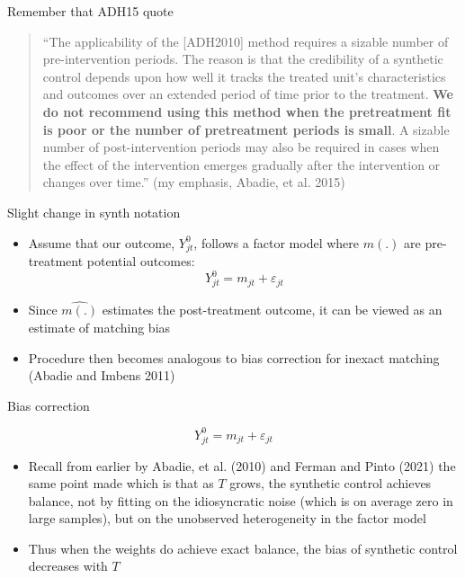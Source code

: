 \documentclass{beamer}
\begin{document}
\begin{frame}{Remember that ADH15 quote}

\begin{quote}
``The applicability of the [ADH2010] method requires a sizable number of pre-intervention periods. The reason is that the credibility of a synthetic control depends upon how well it tracks the treated unit’s characteristics and outcomes over an extended period of time prior to the treatment. \textbf{We do not recommend using this method when the pretreatment fit is poor or the number of pretreatment periods is small}. A sizable number of post-intervention periods may also be required in cases when the effect of the intervention emerges gradually after the intervention or changes over time.'' (my emphasis, Abadie, et al. 2015)
\end{quote}

\end{frame}

\begin{frame}{Slight change in synth notation}

\begin{itemize}
\item Assume that our outcome, $Y^0_{jt}$, follows a factor model where $m(.)$ are pre-treatment potential outcomes: $$ Y_{jt}^0 = m_{jt} + \varepsilon_{jt}$$
\item Since $\widehat{m(.)}$ estimates the post-treatment outcome, it can be viewed as an estimate of matching bias
\item Procedure then becomes analogous to bias correction for inexact matching (Abadie and Imbens 2011)
\end{itemize}

\end{frame}



\begin{frame}{Bias correction}

 $$ Y_{jt}^0 = m_{jt} + \varepsilon_{jt}$$

\begin{itemize}
\item Recall from earlier by Abadie, et al. (2010) and Ferman and Pinto (2021) the same point made which is that as $T$ grows, the synthetic control achieves balance, not by fitting on the idiosyncratic noise (which is on average zero in large samples), but on the unobserved heterogeneity in the factor model
\item Thus when the weights do achieve exact balance, the bias of synthetic control decreases with $T$
\end{itemize}

\end{frame}
\end{document}
